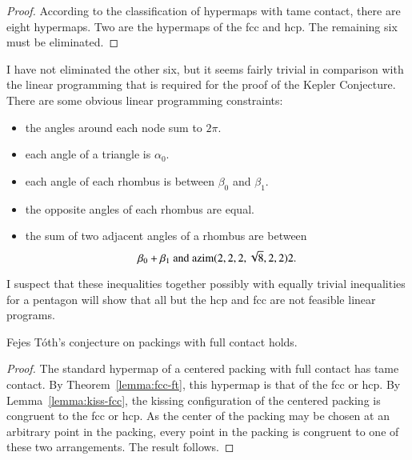 \begin{proof} According to the classification of hypermaps with tame contact, there are eight hypermaps.  Two are the hypermaps of the fcc and hcp.  The remaining six must be eliminated.
\end{proof}

\begin{note}%
I have not eliminated the other six, but it seems fairly trivial in comparison with the linear programming that is required for the proof of the Kepler Conjecture.  There are some obvious linear programming constraints:
\begin{itemize}
\item the angles around each node sum to $2\pi$.
\item each angle of a triangle is $\alpha_0$.
\item each angle of each rhombus is between $\beta_0$ and $\beta_1$.
\item the opposite angles of each rhombus are equal.
\item the sum of two adjacent angles of a rhombus are between
$$
\beta_0 + \beta_1 \hbox{ and } {\operatorname{azim}}(2,2,2,\sqrt8,2,2)2.
$$
\end{itemize}
I suspect that these inequalities together possibly with equally trivial inequalities for a pentagon will show that all but the hcp and fcc are not feasible linear programs.
\end{note}

\begin{theorem}  
Fejes T\'oth's conjecture on packings with full contact holds.
\end{theorem}
%

\begin{proof} The standard hypermap of a centered packing with full contact has tame contact.  By Theorem~\ref{lemma:fcc-ft}, this hypermap is that of the fcc or hcp.  By Lemma~\ref{lemma:kiss-fcc}, the kissing configuration of the centered packing is congruent to the fcc or hcp.  As the center of the packing may be chosen at an arbitrary point in the packing, every point in the packing is congruent to one of these two arrangements.  The result follows.
\end{proof}
%
%

